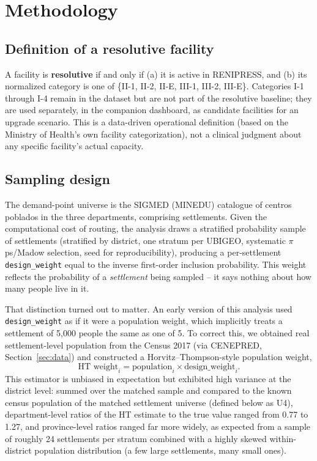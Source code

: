 \section{Methodology}
\label{sec:methodology}

\subsection{Definition of a resolutive facility}
\label{sec:resolutive-def}

A facility is \textbf{resolutive} if and only if (a) it is active in RENIPRESS, and (b) its normalized category is one of \{II-1, II-2, II-E, III-1, III-2, III-E\}. Categories I-1 through I-4 remain in the dataset but are not part of the resolutive baseline; they are used separately, in the companion dashboard, as candidate facilities for an upgrade scenario. This is a data-driven operational definition (based on the Ministry of Health's own facility categorization), not a clinical judgment about any specific facility's actual capacity.

\subsection{Sampling design}
\label{sec:sampling}

The demand-point universe is the SIGMED (MINEDU) catalogue of centros poblados in the three departments, comprising \SigmedUniverse{} settlements. Given the computational cost of routing, the analysis draws a stratified probability sample of \SampleSize{} settlements (stratified by district, one stratum per UBIGEO, systematic $\pi$ps/Madow selection, seed \texttt{\SampleSeed} for reproducibility), producing a per-settlement \texttt{design\_weight} equal to the inverse first-order inclusion probability. This weight reflects the probability of a \emph{settlement} being sampled -- it says nothing about how many people live in it.

That distinction turned out to matter. An early version of this analysis used \texttt{design\_weight} as if it were a population weight, which implicitly treats a settlement of 5{,}000 people the same as one of 5. To correct this, we obtained real settlement-level population from the Census 2017 (via CENEPRED, Section~\ref{sec:data}) and constructed a Horvitz--Thompson-style population weight,
\[
  \text{HT weight}_i = \text{population}_i \times \text{design\_weight}_i .
\]
This estimator is unbiased in expectation but exhibited high variance at the district level: summed over the matched sample and compared to the known census population of the matched settlement universe (defined below as U4), department-level ratios of the HT estimate to the true value ranged from 0.77 to 1.27, and province-level ratios ranged far more widely, as expected from a sample of roughly 24 settlements per stratum combined with a highly skewed within-district population distribution (a few large settlements, many small ones).


